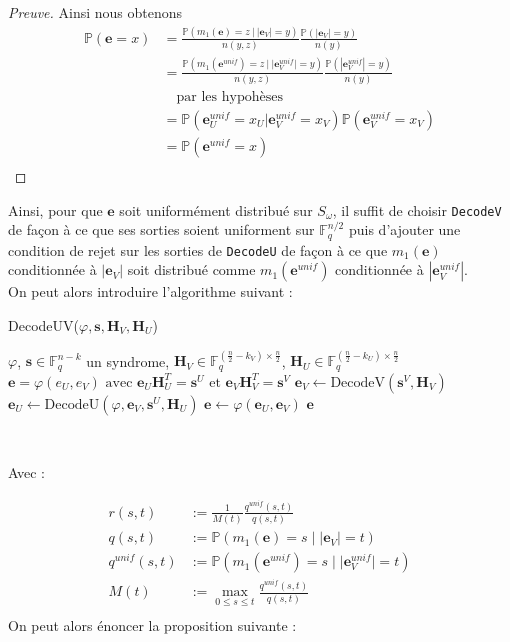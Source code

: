 \documentclass[12pt]{article}
\theoremstyle{plain}
\newcommand{\F}{\mathbb{F}}
\newcommand{\e}{\mathbf{e}}
\newcommand{\s}{\mathbf{s}}
\begin{document}
\begin{proof}[Preuve]
\noindent Ainsi nous obtenons
\begin{equation*}
\begin{split}
\mathbb{P}(\e = x) &= \frac{\mathbb{P}(m_1(\e) = z\ |\ |\e_V| = y)}{n(y,z)}\frac{\mathbb{P}(|\e_V| = y)}{n(y)}\\
 &= \frac{\mathbb{P}(m_1(\e^{unif}) = z\ |\ |\e_V^{unif}| = y)}{n(y,z)}\frac{\mathbb{P}(|\e_V^{unif}| = y)}{n(y)}\\
 &\quad \text{par les hypohèses}\\
 &= \mathbb{P}(\e_U^{unif} = x_U | \e_V^{unif} = x_V)\mathbb{P}(\e_V^{unif} = x_V)\\
 &= \mathbb{P}(\e^{unif} = x)\\
\end{split}
\end{equation*}
\end{proof}


\noindent Ainsi, pour que $\mathbf{e}$ soit uniformément distribué sur $S_\omega$, il suffit de choisir \verb|DecodeV| de façon à ce que ses sorties soient uniforment sur $\F_q^{n/2}$ puis d'ajouter une condition de rejet sur les sorties de \verb|DecodeU| de façon à ce que $m_1(\mathbf{e})$ conditionnée à $|\mathbf{e}_V|$ soit distribué comme $m_1(\mathbf{e}^{unif})$ conditionnée à $|\mathbf{e}_V^{unif}|$. \\
On peut alors introduire l'algorithme suivant :
\begin{algorithm}
	\caption{DecodeUV($\varphi, \s, \mathbf{H}_V, \mathbf{H}_U$)}
	\begin{algorithmic}[1]
   	 	\REQUIRE $\varphi$, $\s \in \F_q^{n-k}$ un syndrome, $\mathbf{H}_V \in \F_q^{(\frac{n}{2} - k_V) \times \frac{n}{2}}$, $\mathbf{H}_U \in \F_q^{(\frac{n}{2} - k_U) \times \frac{n}{2}}$
   	 	\ENSURE $\e = \varphi(e_U, e_V) \text{ avec } \e_U\mathbf{H}_U^T = \s^U \text{ et } \e_V\mathbf{H}_V^T = \s^V$
    	\STATE $\e_V \leftarrow \text {DecodeV}(\s^V,\mathbf{H}_V)$
    	\REPEAT 
    	\STATE $\e_U \leftarrow \text {DecodeU}(\varphi, \e_V, \s^U, \mathbf{H}_U)$
    	\STATE $\e \leftarrow \varphi(\e_U,\e_V)$
    	\UNTIL {$\text{rand}([0,1]) > \mathbf{r}_U(|\e_V|, m_1(\e))$}
    	\RETURN $\e$
    \end{algorithmic}
\end{algorithm}\


\noindent Avec :

\begin{equation*}
   \begin{split}
    r(s,t) &:= \frac{1}{M(t)}\frac{q^{unif}(s,t)}{q(s,t)} \\
    q(s,t) &:= \mathbb{P}(m_1(\mathbf{e})=s\;|\;|\mathbf{e}_V|=t)\\[.6cm]
    q^{unif}(s,t) &:= \mathbb{P}(m_1(\mathbf{e}^{unif})=s\;|\;|\mathbf{e}^{unif}_V|=t)\\[.6cm]
    M(t) &:= \max_{0 \leq s \leq t} \frac{q^{unif}(s,t)}{q(s,t)}\\[.6cm]
    \end{split}
\end{equation*}
On peut alors énoncer la proposition suivante :
\end{document}
